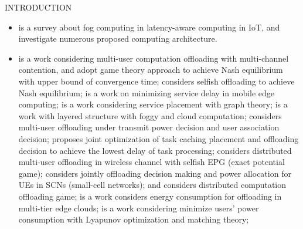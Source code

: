 \documentclass[10pt, conference, letterpaper]{IEEEtran}
\begin{document}
\begin{section}{INTRODUCTION}
\begin{itemize}
            \item \text{[Survey]}
                \cite{Naha2018} is a survey about fog computing in latency-aware computing in IoT, and investigate numerous proposed computing architecture.
            
            \item \text{[misc]}
                \cite{Chen2016} is a work considering multi-user computation offloading with multi-channel contention, and adopt game theory approach to achieve Nash equilibrium with upper bound of convergence time;
                \cite{Josilo2019} considers selfish offloading to achieve Nash equilibrium;
                \cite{Rodrigues2017} is a work on minimizing service delay in mobile edge computing;
                \cite{Wang2017} is a work considering service placement with graph theory;
                \cite{Masip-Bruin2016} is a work with layered structure with foggy and cloud computation;
                \cite{Zhang2018} considers multi-user offloading under transmit power decision and user association decision;
                \cite{Chen2018a} proposes joint optimization of task caching placement and offloading decision to achieve the lowest delay of task processing;
                \cite{Dinh2018} considers distributed multi-user offloading in wireless channel with selfish EPG (exact potential game);
                \cite{Guo2018} considers jointly offloading decision making and power allocation for UEs in SCNs (small-cell networks);
                \cite{yang2018} and \cite{Josilo2019a} considers distributed computation offloading game;
                \cite{ElHaber2019} is a work considers energy consumption for offloading in multi-tier edge clouds;
                \cite{Liu2018} is a work considering minimize users' power consumption with Lyapunov optimization and matching theory;
        \end{itemize}

    \end{section}
\end{document}
